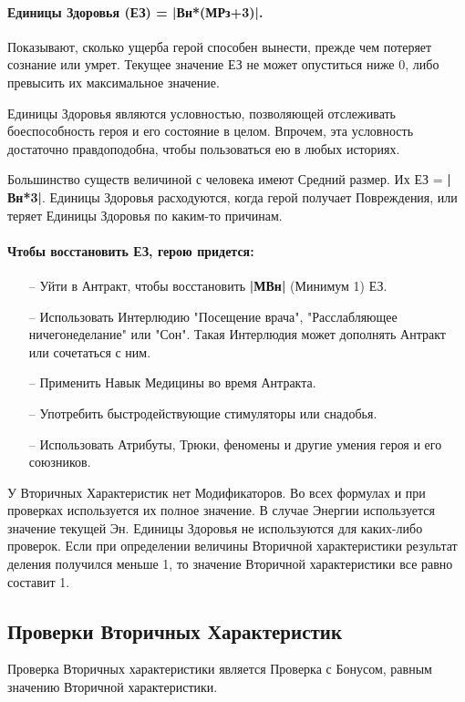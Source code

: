 \paragraph{Единицы Здоровья (ЕЗ) = |Вн*(МРз+3)|.} Показывают, сколько ущерба герой способен вынести, прежде чем потеряет сознание или умрет. Текущее значение ЕЗ не может опуститься ниже 0, либо превысить их максимальное значение.
\begin{tcolorbox}
  Единицы Здоровья являются условностью, позволяющей отслеживать боеспособность героя и его состояние в целом. Впрочем, эта условность достаточно правдоподобна, чтобы пользоваться ею в любых историях.
\end{tcolorbox}
Большинство существ величиной с человека имеют Средний размер. Их ЕЗ = \textbf{|Вн*3|}.
\newline Единицы Здоровья расходуются, когда герой получает Повреждения, или теряет Единицы Здоровья по каким-то причинам. 
\paragraph{Чтобы восстановить ЕЗ, герою придется:}
\begin{itemize}
    \item[--] Уйти в Антракт, чтобы восстановить \textbf{|МВн|} (Минимум 1) ЕЗ.
    \item[--] Использовать Интерлюдию "Посещение врача", "Расслабляющее ничегонеделание" или "Сон". Такая Интерлюдия может дополнять Антракт или сочетаться с ним.
    \item[--] Применить Навык Медицины во время Антракта.
    \item[--] Употребить быстродействующие стимуляторы или снадобья.
    \item[--] Использовать Атрибуты, Трюки, феномены и другие умения героя и его союзников.
\end{itemize}

У Вторичных Характеристик нет Модификаторов. Во всех формулах и при проверках используется их полное значение. В случае Энергии используется значение текущей Эн. Единицы Здоровья не используются для каких-либо проверок.
\newline Если при определении величины Вторичной характеристики результат деления получился меньше 1, то значение Вторичной характеристики все равно составит 1. 

\subsection{Проверки Вторичных Характеристик}
Проверка Вторичных характеристики является Проверка с Бонусом, равным значению Вторичной характеристики.


